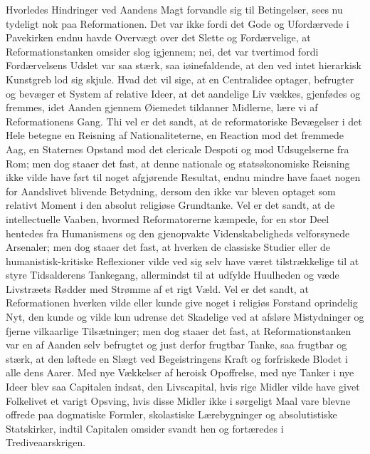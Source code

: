 \documentclass[12pt]{book}
\newcommand{\opage}[1]{\marginnote{\footnotesize\textit{[#1]}}}
\begin{document}
Hvorledes Hindringer ved Aandens Magt forvandle
sig til Betingelser, sees nu tydeligt nok paa Reformationen.
Det var ikke fordi det Gode og Ufordærvede i Pavekirken
endnu havde Overvægt over det Slette og Fordærvelige,
at Reformationstanken omsider slog igjennem;
nei, det var tvertimod fordi Fordærvelsens Udslet var saa
\opage{31}\setcounter{footnote}{0}%
stærk, saa iøinefaldende, at den ved intet hierarkisk Kunstgreb
lod sig skjule. Hvad det vil sige, at en Centralidee
optager, befrugter og bevæger et System af relative Ideer,
at det aandelige Liv vækkes, gjenfødes og fremmes, idet
Aanden gjennem Øiemedet tildanner Midlerne, lære vi af
Reformationens Gang. Thi vel er det sandt, at de reformatoriske
Bevægelser i det Hele betegne en Reisning af
Nationaliteterne, en Reaction mod det fremmede Aag, en
Staternes Opstand mod det clericale Despoti og mod
Udsugelserne fra Rom; men dog staaer det fast, at denne
nationale og statsøkonomiske Reisning ikke vilde have
ført til noget afgjørende Resultat, endnu mindre have
faaet nogen for Aandslivet blivende Betydning, dersom
den ikke var bleven optaget som relativt Moment i den
absolut religiøse Grundtanke. Vel er det sandt, at de
intellectuelle Vaaben, hvormed Reformatorerne kæmpede,
for en stor Deel hentedes fra Humanismens og den gjenopvakte
Videnskabeligheds velforsynede Arsenaler; men
dog staaer det fast, at hverken de classiske Studier eller
de humanistisk-kritiske Reflexioner vilde ved sig selv have
været tilstrækkelige til at styre Tidsalderens Tankegang,
allermindst til at udfylde Huulheden og væde Livstræets
Rødder med Strømme af et rigt Væld. Vel er det sandt, at
Reformationen hverken vilde eller kunde give noget i
religiøs Forstand oprindelig Nyt, den kunde og vilde kun
udrense det Skadelige ved at afsløre Mistydninger og
fjerne vilkaarlige Tilsætninger; men dog staaer det fast,
at Reformationstanken var en af Aanden selv befrugtet
og just derfor frugtbar Tanke, saa frugtbar og stærk, at den
løftede en Slægt ved Begeistringens Kraft og forfriskede
Blodet i alle dens Aarer. Med nye Vækkelser af heroisk
Opoffrelse, med nye Tanker i nye Ideer blev saa Capitalen
indsat, den Livscapital, hvis rige Midler vilde have
givet Folkelivet et varigt Opsving, hvis disse Midler ikke
\opage{32}\setcounter{footnote}{0}%
i sørgeligt Maal vare blevne offrede paa dogmatiske
Formler, skolastiske Lærebygninger og absolutistiske
Statskirker, indtil Capitalen omsider svandt hen og fortæredes
i Trediveaarskrigen.
\end{document}
